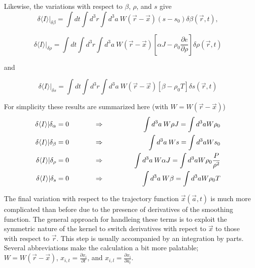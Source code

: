 Likewise, the variations with respect to $\beta$, $\rho$, and $s$ give
\begin{equation}
\delta \langle I \rangle \vert_{\delta \beta} = \int dt \int d^3r \int d^3a \: W({\vec r} - {\vec x})(s - s_0) \delta \beta({\vec r},t),
\end{equation}

\begin{equation}
\delta \langle I \rangle \vert_{\delta \rho} = \int dt \int d^3r \int d^3a \: W({\vec r} - {\vec x}) \left[\alpha J - \rho_0 \frac{\partial e}{\partial \rho} \right] \delta \rho({\vec r},t)
\end{equation}

and

\begin{equation}
\delta \langle I \rangle \vert_{\delta s} = \int dt \int d^3r \int d^3a \: W({\vec r} - {\vec x}) \left[ \beta - \rho_0 T\right] \delta s({\vec r},t)
\end{equation}

For simplicity these results are summarized here (with $W = W({\vec r} - {\vec x})$)
\begin{eqnarray}\label{summ}
\delta \langle I \rangle \vert \delta_{\alpha} = 0 & \hspace{0.5in} \Rightarrow \hspace{0.5in} & \int d^3a \: W \rho J = \int d^3a W \rho_0 \\
%
\delta \langle I \rangle \vert \delta_{\beta} = 0 & \hspace{0.5in} \Rightarrow \hspace{0.5in} & \int d^3a \: W s = \int d^3a W s_0 \\
%
\delta \langle I \rangle \vert \delta_{\rho}  = 0 & \hspace{0.5in} \Rightarrow \hspace{0.5in} & \int d^3a \: W \alpha J = \int d^3a W \rho_0 \frac{P}{\rho^2}\\
%
\delta \langle I \rangle \vert \delta_{s} = 0 & \hspace{0.5in} \Rightarrow \hspace{0.5in} & \int d^3a \: W \beta = \int d^3a W \rho_0 T
\end{eqnarray}

The final variation with respect to the trajectory function ${\vec x}({\vec a},t)$ is much more complicated than before due to the presence of derivatives of the smoothing function.  The general approach for handleing these terms is to exploit the symmetric nature of the kernel to switch derivatives with repect to ${\vec x}$ to those with respect to ${\vec r}$.  This step is usually accompanied by an integration by parts.  Several abbreviations make the calculation a bit more palatable; $W = W({\vec r} - {\vec x})$, $x_{i,t} = \frac{\partial x_i}{\partial t}$, and $x_{i,l} = \frac{\partial x_i}{\partial a_l}$.

